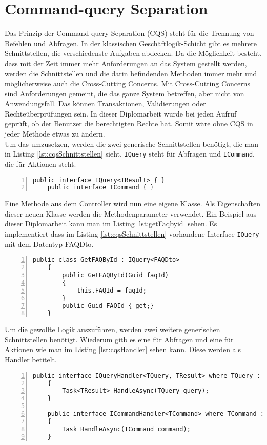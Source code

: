 \chapter{Command-query Separation}
Das Prinzip der Command-query Separation (CQS) steht für die Trennung von Befehlen und Abfragen. In der klassischen Geschäftlogik-Schicht gibt es mehrere Schnittstellen, die verschiedenste Aufgaben abdecken. Da die Möglichkeit besteht, dass  mit der Zeit immer mehr Anforderungen an das System gestellt werden, werden die Schnittstellen und die darin befindenden Methoden immer mehr und möglicherweise auch die Cross-Cutting Concerns. Mit Cross-Cutting Concerns sind Anforderungen gemeint, die das ganze System betreffen, aber nicht von Anwendungsfall. Das können Transaktionen, Validierungen oder Rechteüberprüfungen sein. In dieser Diplomarbeit wurde bei jeden Aufruf geprüft, ob der Benutzer die berechtigten Rechte hat. Somit wäre ohne CQS in jeder Methode etwas zu ändern. \autocite{cqsSOLIDeArchitektur}\\
Um das umzusetzen, werden die zwei generische Schnittstellen benötigt, die man in Listing \ref{lst:cqsSchnittstellen} sieht. \texttt{IQuery} steht für Abfragen und \texttt{ICommand}, die für Aktionen steht.
\begin{lstlisting}[caption={CQS-Schnittstellen},captionpos=b, numbers=left, backgroundcolor=\color{black!10},language={[Sharp]C}, label={lst:cqsSchnittstellen}]
	public interface IQuery<TResult> { }
	public interface ICommand { }
\end{lstlisting}
Eine Methode aus dem Controller wird nun eine eigene Klasse. Als Eigenschaften dieser neuen Klasse werden die Methodenparameter verwendet. Ein Beispiel aus dieser Diplomarbeit kann man im Listing \ref{lst:getFaqbyid} sehen. Es implementiert dass im Listing \ref{lst:cqsSchnittstellen} vorhandene Interface \texttt{IQuery} mit dem Datentyp FAQDto.
\begin{lstlisting}[caption={CQS-Query Beispiel},captionpos=b, numbers=left, backgroundcolor=\color{black!10},language={[Sharp]C}, label={lst:getFaqbyid}]
	public class GetFAQById : IQuery<FAQDto>
	{
		public GetFAQById(Guid faqId)
		{
			this.FAQId = faqId;
		}
		public Guid FAQId { get;}
	}
\end{lstlisting}
Um die gewollte Logik auszuführen, werden zwei weitere generischen Schnittstellen benötigt. Wiederum gitb es eine für Abfragen und eine für Aktionen wie man im Listing \ref{lst:cqsHandler} sehen kann. Diese werden als Handler betitelt. \autocite{cqsSOLIDeArchitektur}
\begin{lstlisting}[caption={CQS-Handler},captionpos=b, numbers=left, backgroundcolor=\color{black!10},language={[Sharp]C}, label={lst:cqsHandler}]
	public interface IQueryHandler<TQuery, TResult>	where TQuery : IQuery<TResult>
	{
		Task<TResult> HandleAsync(TQuery query);
	}
	
	public interface ICommandHandler<TCommand> where TCommand : ICommand
	{
		Task HandleAsync(TCommand command);
	}
\end{lstlisting}
